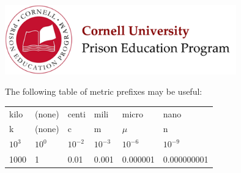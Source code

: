 \documentclass[12pt]{exam}
\begin{document}

\begin{flushright}
\vspace{0.2in}

\end{flushright}

\begin{center}
\includegraphics[width=10cm]{../images/logo.png}
\end{center}

\begin{center}
\end{center}
\vspace{0.2in}


\vspace{0.2in}

The following table of metric prefixes may be useful:
\vspace{0.2in}

\noindent\begin{tabularx}{\textwidth}{ X X X X X X }
	kilo & (none) & centi & mili & micro & nano \\
	k & (none) & c & m & $\mu$ & n \\
	$10^3$ & $10^0$ & $10^{-2}$ & $10^{-3}$ & $10^{-6}$ & $10^{-9}$ \\
	1000 & 1 & 0.01 & 0.001 & 0.000001 & 0.000000001 
\end{tabularx}

\clearpage
\end{document}

